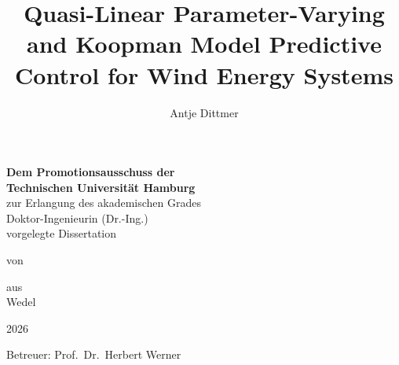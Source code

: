 \documentclass[12pt,a4paper,twoside]{report}
\title{Quasi-Linear Parameter-Varying and Koopman Model Predictive Control for Wind Energy Systems}
\author{Antje Dittmer}
\begin{document}
    \makeatletter
    \begin{titlepage}
        \begin{center}
            \vspace*{1cm}
            \LARGE
            \textbf{\@title}
            
            \vspace{2.5cm}
            \large
            \textbf{Dem Promotionsausschuss der\\
                Technischen Universität Hamburg}\\[1ex]
            zur Erlangung des akademischen Grades\\[1ex]
            Doktor-Ingenieurin (Dr.-Ing.)\\[5ex]
            vorgelegte Dissertation
            
            \vspace{1.5cm}
            von\\ \@author
            
            \vspace{2cm}
            aus\\ Wedel
            
            \vspace{2cm}
            2026 %
        \end{center}
        \vfill
        Betreuer: Prof.\ Dr.\ Herbert Werner
    \end{titlepage}
    \makeatother
    
\end{document}
